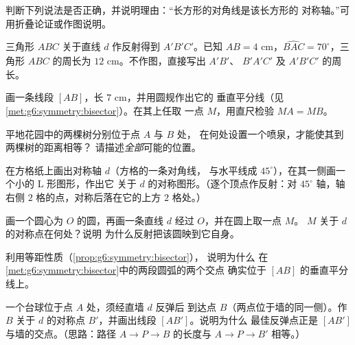 \begin{exercise}[$\star$]\label{exo:g6:symmetry:5}
判断下列说法是否正确，并说明理由：“长方形的对角线是该长方形的
对称轴。”可用折叠论证或作图说明。
\end{exercise}

\begin{exercise}[$\star$]\label{exo:g6:symmetry:6}
三角形 $ABC$ 关于直线 $d$ 作反射得到 $A'B'C'$。已知
$AB = 4$ cm，$\widehat{BAC} = 70^\circ$，三角形 $ABC$ 的周长为
$12$ cm。不作图，直接写出 $A'B'$、
$\widehat{B'A'C'}$ 及 $A'B'C'$ 的周长。
\end{exercise}

\begin{exercise}[$\star$]\label{exo:g6:symmetry:7}
画一条线段 $[AB]$，长 $7$ cm，并用圆规作出它的
垂直平分线（见\cref{met:g6:symmetry:bisector}）。在其上任取
一点 $M$，用直尺检验 $MA = MB$。
\end{exercise}

\begin{exercise}[$\star\star$]\label{exo:g6:symmetry:8}
平地花园中的两棵树分别位于点 $A$ 与 $B$ 处，
在何处设置一个喷泉，才能使其到两棵树的距离相等？
请描述\emph{全部}可能的位置。
\end{exercise}

\begin{exercise}[$\star\star$]\label{exo:g6:symmetry:9}
在方格纸上画出对称轴 $d$（方格的一条对角线，
与水平线成 $45^\circ$），在其一侧画一个小的 L 形图形，作出它
关于 $d$ 的对称图形。（逐个顶点作反射：对 $45^\circ$
轴，轴右侧 $2$ 格的点，对称后落在它的上方
$2$ 格处。）
\end{exercise}

\begin{exercise}[$\star\star$]\label{exo:g6:symmetry:10}
画一个圆心为 $O$ 的圆，再画一条直线 $d$ 经过 $O$，并在圆上取一点 $M$。
$M$ 关于 $d$ 的对称点在何处？说明
为什么反射把该圆映到它自身。
\end{exercise}

\begin{exercise}[$\star\star$]\label{exo:g6:symmetry:11}
利用等距性质（\cref{prop:g6:symmetry:bisector}），
说明为什么
在\cref{met:g6:symmetry:bisector}中的两段圆弧的两个交点
确实位于 $[AB]$ 的垂直平分线上。
\end{exercise}

\begin{exercise}[$\star\star\star$]\label{exo:g6:symmetry:12}
一个台球位于点 $A$ 处，须经直墙 $d$ 反弹后
到达点 $B$（两点位于墙的同一侧）。作 $B$
关于 $d$ 的对称点 $B'$，并画出线段 $[AB']$。说明为什么
最佳反弹点正是 $[AB']$ 与墙的交点。（思路：路径
$A \to P \to B$ 的长度与 $A \to P \to B'$ 相等。）
\end{exercise}

